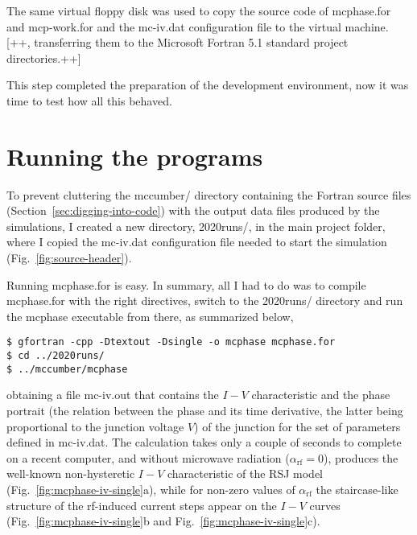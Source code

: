 The same virtual floppy disk was used to copy the source code of \textsf{mcphase.for} and \textsf{mcp-work.for} and the \textsf{mc-iv.dat} configuration file to the virtual machine.
[++, transferring them to the Microsoft Fortran 5.1 standard project directories.++]

%

This step completed the preparation of the development environment, now it was time to test how all this behaved.



\section{Running the programs}

To prevent cluttering the \textsf{mccumber/} directory containing the Fortran source files (Section~\ref{sec:digging-into-code}) with the output data files produced by the simulations, I created  a new directory, \textsf{2020runs/}, in the main project folder, where I copied the \textsf{mc-iv.dat} configuration file needed to start the simulation (Fig.~\ref{fig:source-header}).

Running \textsf{mcphase.for} is easy. In summary, all I had to do was to compile \textsf{mcphase.for} with the right directives, switch to the \textsf{2020runs/} directory and run the \textsf{mcphase} executable from there, as summarized below,

\begin{lstlisting}
$ gfortran -cpp -Dtextout -Dsingle -o mcphase mcphase.for
$ cd ../2020runs/
$ ../mccumber/mcphase
\end{lstlisting}

obtaining a file \textsf{mc-iv.out} that contains the $I - V$ characteristic and the phase portrait (the relation between the phase and its time derivative, the latter being proportional to the junction voltage $V$) of the junction for the set of parameters defined in \textsf{mc-iv.dat}. 
The calculation takes only a couple of seconds to complete on a recent computer, and without microwave radiation ($\alpha_\mathrm{rf} = 0$), produces the well-known non-hysteretic $I - V$ characteristic of the RSJ model (Fig.~\ref{fig:mcphase-iv-single}a), while for non-zero values of $\alpha_\mathrm{rf}$ the staircase-like structure of the rf-induced current steps appear on the $I - V$ curves (Fig.~\ref{fig:mcphase-iv-single}b and Fig.~\ref{fig:mcphase-iv-single}c).

